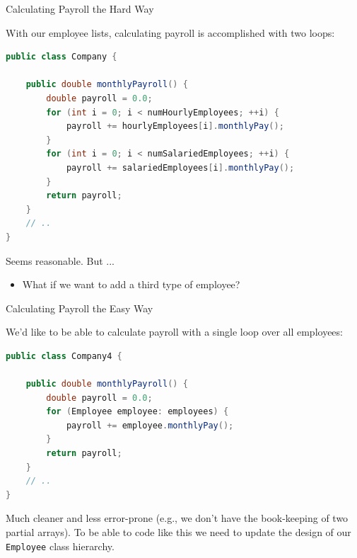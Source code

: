\documentclass{beamer}
\begin{document}
\begin{frame}[fragile]{Calculating Payroll the Hard Way}


With our employee lists, calculating payroll is accomplished with two loops:
\begin{lstlisting}[language=Java]
public class Company {

    public double monthlyPayroll() {
        double payroll = 0.0;
        for (int i = 0; i < numHourlyEmployees; ++i) {
            payroll += hourlyEmployees[i].monthlyPay();
        }
        for (int i = 0; i < numSalariedEmployees; ++i) {
            payroll += salariedEmployees[i].monthlyPay();
        }
        return payroll;
    }
    // ..
}
\end{lstlisting}
Seems reasonable.  But ...
\begin{itemize}
\item What if we want to add a third type of employee?
\end{itemize}


\end{frame}

\begin{frame}[fragile]{Calculating Payroll the Easy Way}


We'd like to be able to calculate payroll with a single loop over all employees:
\begin{lstlisting}[language=Java]
public class Company4 {

    public double monthlyPayroll() {
        double payroll = 0.0;
        for (Employee employee: employees) {
            payroll += employee.monthlyPay();
        }
        return payroll;
    }
    // ..
}
\end{lstlisting}

Much cleaner and less error-prone (e.g., we don't have the book-keeping of two partial arrays).  To be able to code like this we need to update the design of our {\tt Employee} class hierarchy.


\end{frame}
\end{document}
